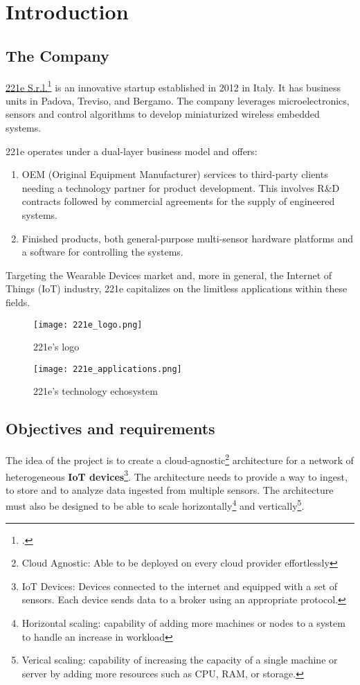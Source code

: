 \chapter{Introduction}
\label{cap:introduction}

\section{The Company}
\href{https://www.221e.com/about-us}{221e S.r.l.}\footcite{site:221e} is an innovative startup established in 2012 in Italy. It has business units in Padova, Treviso, and Bergamo. The company leverages microelectronics, sensors and control algorithms to develop miniaturized wireless embedded systems.

221e operates under a dual-layer business model and offers:
\begin{enumerate}
    \item OEM (Original Equipment Manufacturer) services to third-party clients needing a technology partner for product development. This involves R\&D contracts followed by commercial agreements for the supply of engineered systems.
    \item Finished products, both general-purpose multi-sensor hardware platforms and a software for controlling the systems. 
\end{enumerate}

Targeting the Wearable Devices market and, more in general, the Internet of Things (IoT) industry, 221e capitalizes on the limitless applications within these fields. 

\begin{figure}[htbp]
    \centering
    \texttt{[image: 221e\_logo.png]}
    \caption{221e's logo}
\end{figure}

\begin{figure}[htbp]
    \centering
    \texttt{[image: 221e\_applications.png]}
    \caption{221e's technology echosystem}
\end{figure}


\newpage
\section{Objectives and requirements}
\label{sec:objectives-and-requirements}

The idea of the project is to create a cloud-agnostic\footnote{Cloud Agnostic: Able to be deployed on every cloud provider effortlessly} architecture for a network of heterogeneous \textbf{IoT devices}\footnote{IoT Devices: Devices connected to the internet and equipped with a set of sensors. Each device sends data to a broker using an appropriate protocol.}. The architecture needs to provide a way to ingest, to store and to analyze data ingested from multiple sensors. The architecture must also be designed to be able to scale horizontally\footnote{Horizontal scaling: capability of adding more machines or nodes to a system to handle an increase in workload} and vertically\footnote{Verical scaling: capability of increasing the capacity of a single machine or server by adding more resources such as CPU, RAM, or storage.}.

